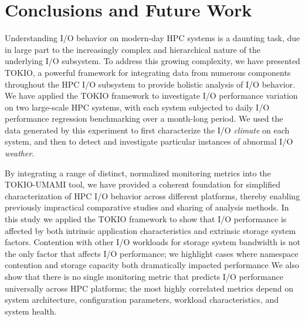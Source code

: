 \section{Conclusions and Future Work} \label{sec:conclusions}

Understanding I/O behavior on modern-day HPC systems is a daunting task, due in large part to the increasingly complex and hierarchical nature of the underlying I/O subsystem.
To address this growing complexity, we have presented TOKIO, a powerful framework for integrating data from numerous components throughout the HPC I/O subsystem to provide holistic analysis of I/O behavior.
We have applied the TOKIO framework to investigate I/O performance variation on two large-scale HPC systems, with each system subjected to daily I/O performance regression benchmarking over a month-long period.
We used the data generated by this experiment to first characterize the I/O \emph{climate} on each system, and then to detect and investigate particular instances of abnormal I/O \emph{weather}.

By integrating a range of distinct, normalized monitoring metrics into the
TOKIO-UMAMI tool, we have provided a coherent foundation for simplified
characterization of HPC I/O behavior across different platforms, thereby
enabling previously impractical comparative studies and sharing of analysis
methods. 
In this study we applied the TOKIO framework to show that I/O performance is affected by both intrinsic application characteristics and extrinsic storage system factors. Contention with other I/O workloads for storage system bandwidth is not the only factor that affects I/O performance; %
we highlight cases  where namespace contention and storage capacity both dramatically impacted performance
We also show that there is no single monitoring metric that predicts I/O performance
universally across HPC platforms; the most highly correlated metrics depend
on system architecture, configuration parameters, workload characteristics,
and system health.

